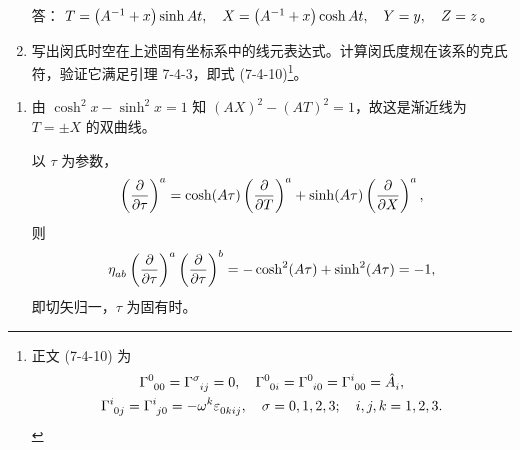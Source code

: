 \begin{xiti}
\begin{enumerate}[label=(\alph*)]
		答： $T=\left( A^{-1} + x \right) \sinh At \qc X= \left( A^{-1} + x \right) \cosh At \qc Y=y \qc Z=z$。

		\item 写出闵氏时空在上述固有坐标系中的线元表达式。计算闵氏度规在该系的克氏符，验证它满足引理 7-4-3，即式 (7-4-10)\footnote{正文 (7-4-10) 为
		\begin{equation*}
			\begin{gathered}
				\ChristoffelSymbol{0}{0}{0} = \ChristoffelSymbol{\sigma}{i}{j} = 0 \qc \ChristoffelSymbol{0}{0}{i} = \ChristoffelSymbol{0}{i}{0} = \ChristoffelSymbol{i}{0}{0} = \tensor{\hat{A}}{_i},\\
				\ChristoffelSymbol{i}{0}{j} = \ChristoffelSymbol{i}{j}{0} = - \tensor{\omega}{^k} \tensor{\varepsilon}{_0_k_i_j} \qc \sigma = 0,1,2,3; \quad i,j,k = 1,2,3.
			\end{gathered}
		\end{equation*}
		}。
	\end{enumerate}

		\begin{zm}
			\begin{enumerate}[label=(\alph*)]
				\item 由 $\cosh^2 x - \sinh^2 x = 1$ 知 $\left( A X \right)^2 - \left( A T \right)^2 = 1$，故这是渐近线为 $T=\pm X$ 的双曲线。

				以 $\tau$ 为参数，
				\begin{equation*}
					\tensor{\left( \pdv{\tau} \right)}{^a} = \cosh(A\tau) \tensor{\left( \pdv{T} \right)}{^a} + \sinh(A\tau) \tensor{\left( \pdv{X} \right)}{^a},
				\end{equation*}
				则
				\begin{equation*}
					\tensor{\eta}{_a_b} \tensor{\left( \pdv{\tau} \right)}{^a} \tensor{\left( \pdv{\tau} \right)}{^b} = - \cosh[2](A\tau) + \sinh[2](A\tau) = -1,
				\end{equation*}
				即切矢归一，$\tau$ 为固有时。


\end{enumerate}
\end{zm}
\end{xiti}
